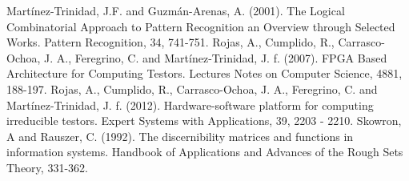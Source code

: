 \documentclass[conference]{IEEEtran}
\begin{document}
\begin{thebibliography}{20}
Mart\'inez-Trinidad, J.F. and Guzm\'an-Arenas, A. (2001). The Logical Combinatorial Approach to Pattern Recognition an Overview through Selected Works. Pattern Recognition, 34, 741-751.
Rojas, A., Cumplido, R., Carrasco-Ochoa, J. A., Feregrino, C. and Mart\'inez-Trinidad, J. f. (2007). FPGA Based Architecture for Computing Testors. Lectures Notes on Computer Science, 4881, 188-197.
Rojas, A., Cumplido, R., Carrasco-Ochoa, J. A., Feregrino, C. and Mart\'inez-Trinidad, J. f. (2012). Hardware-software platform for computing irreducible testors. Expert Systems with Applications, 39, 2203 - 2210.
Skowron, A and Rauszer, C. (1992). The discernibility matrices and functions in information systems. Handbook of Applications and Advances of the Rough Sets Theory, 331-362.
\end{thebibliography}
\end{document}

